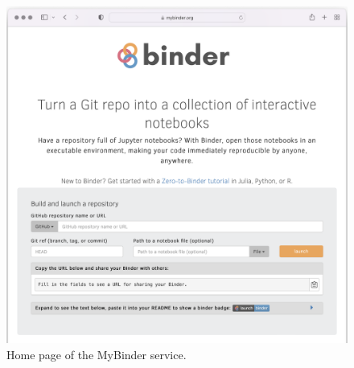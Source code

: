 \begin{figure}
  \begin{minipage}[b]{0.67\textwidth}
    \includegraphics[width=1.0\textwidth]{images/mybinder.png}
  \end{minipage}\hfill
  \begin{minipage}[b]{0.3\textwidth}
    \caption{Home page of the MyBinder service.}  \label{fig:mybinder-homepage}
  \end{minipage}
\end{figure}



